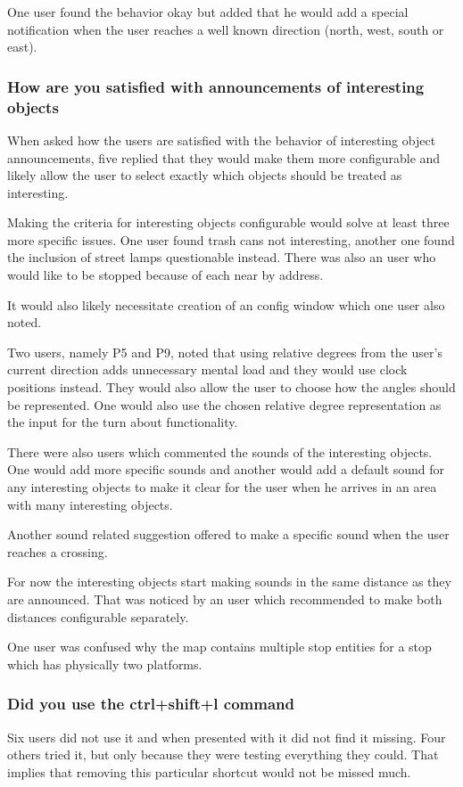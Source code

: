 \documentclass[nolof,digital]{fithesis3}
\begin{document}
One user found the behavior okay but added that he would add a special notification when the user reaches a well known direction (north, west, south or east).
\subsubsection{How are you satisfied with announcements of interesting objects}
When asked how the users are satisfied with the behavior of interesting object announcements, five replied that they would make them more configurable and likely allow the user to select exactly which objects should be treated as interesting.

Making the criteria for interesting objects configurable would solve at least three more specific issues. One user found trash cans not interesting, another one found the inclusion of street lamps questionable instead. There was also an user who would like to be stopped because of each near by address.

It would also likely necessitate creation of an config window which one user also noted.

Two users, namely  P5 and P9, noted that using relative degrees from the user's current direction adds unnecessary mental load and they would use clock positions instead. They would also allow the user to choose how the angles should be represented. One would also use the chosen relative degree representation as the input for the turn about functionality.

There were also users which commented the sounds of the interesting objects. One would add more specific sounds and another would add a default sound for any interesting objects to make it clear for the user when he arrives in an area with many interesting objects.

Another sound related suggestion offered to make a specific sound when the user reaches a crossing.

For now the interesting objects start making sounds in the same distance as they are announced. That was noticed by an user which recommended to make both distances configurable separately.

One  user was confused why the map contains multiple stop entities for a stop which has physically two platforms.
\subsubsection{Did you use the ctrl+shift+l command}
Six users did not use it and when presented with it did not find it missing. Four others tried it, but only because they were testing everything they could. That implies that removing this particular shortcut would not be missed much.
\end{document}
